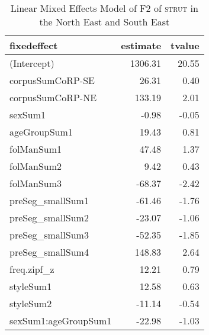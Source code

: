 \begin{table}[ht]
\centering
\begin{tabular}{lrr}
  \hline
fixedeffect & estimate & tvalue \\ 
  \hline
(Intercept) & 1306.31 & 20.55 \\ 
  corpusSumCoRP-SE & 26.31 & 0.40 \\ 
  corpusSumCoRP-NE & 133.19 & 2.01 \\ 
  sexSum1 & -0.98 & -0.05 \\ 
  ageGroupSum1 & 19.43 & 0.81 \\ 
  folManSum1 & 47.48 & 1.37 \\ 
  folManSum2 & 9.42 & 0.43 \\ 
  folManSum3 & -68.37 & -2.42 \\ 
  preSeg\_smallSum1 & -61.46 & -1.76 \\ 
  preSeg\_smallSum2 & -23.07 & -1.06 \\ 
  preSeg\_smallSum3 & -52.35 & -1.85 \\ 
  preSeg\_smallSum4 & 148.83 & 2.64 \\ 
  freq.zipf\_z & 12.21 & 0.79 \\ 
  styleSum1 & 12.58 & 0.63 \\ 
  styleSum2 & -11.14 & -0.54 \\ 
  sexSum1:ageGroupSum1 & -22.98 & -1.03 \\ 
   \hline
\end{tabular}
\caption{Linear Mixed Effects Model of F2 of \textsc{strut} in the North East and South East \label{tbl:SF2NE}} 
\end{table}
